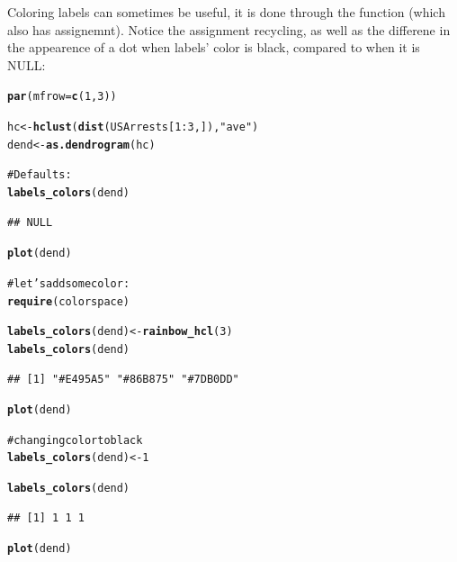 \documentclass[shortnames,nojss,article]{jss}\usepackage{graphicx, color}
\makeatletter
\newcommand{\hlfunctioncall}[1]{\textcolor[rgb]{0.501960784313725,0,0.329411764705882}{\textbf{#1}}}%
\newcommand{\hlstring}[1]{\textcolor[rgb]{0.6,0.6,1}{#1}}%
\newcommand{\hlcomment}[1]{\textcolor[rgb]{0.180392156862745,0.6,0.341176470588235}{#1}}%
\newenvironment{kframe}{%
 \def\at@end@of@kframe{}%
 \ifinner\ifhmode%
  \def\at@end@of@kframe{\end{minipage}}%
  \begin{minipage}{\columnwidth}%
 \fi\fi%
 \def\FrameCommand##1{\hskip\@totalleftmargin \hskip-\fboxsep
 \colorbox{shadecolor}{##1}\hskip-\fboxsep
     \hskip-\linewidth \hskip-\@totalleftmargin \hskip\columnwidth}%
 \MakeFramed {\advance\hsize-\width
   \@totalleftmargin\z@ \linewidth\hsize
   \@setminipage}}%
 {\par\unskip\endMakeFramed%
 \at@end@of@kframe}
\newenvironment{knitrout}{}{} %
\makeatother
\begin{document}
Coloring labels can sometimes be useful, it is done through the  function (which also has assignemnt). Notice the assignment recycling, as well as the differene in the appearence of a dot when labels' color is black, compared to when it is NULL:

\begin{knitrout}
\color{fgcolor}\begin{kframe}
\begin{alltt}

\hlfunctioncall{par}(mfrow = \hlfunctioncall{c}(1, 3))

hc <- \hlfunctioncall{hclust}(\hlfunctioncall{dist}(USArrests[1:3, ]), \hlstring{"ave"})
dend <- \hlfunctioncall{as.dendrogram}(hc)

\hlcomment{# Defaults:}
\hlfunctioncall{labels_colors}(dend)
\end{alltt}
\begin{verbatim}
## NULL
\end{verbatim}
\begin{alltt}
\hlfunctioncall{plot}(dend)

\hlcomment{# let's add some color:}
\hlfunctioncall{require}(colorspace)
\end{alltt}


{\ttfamily\noindent\itshape\color{messagecolor}{\#\# Loading required package: colorspace}}\begin{alltt}
\hlfunctioncall{labels_colors}(dend) <- \hlfunctioncall{rainbow_hcl}(3)
\hlfunctioncall{labels_colors}(dend)
\end{alltt}
\begin{verbatim}
## [1] "#E495A5" "#86B875" "#7DB0DD"
\end{verbatim}
\begin{alltt}
\hlfunctioncall{plot}(dend)

\hlcomment{# changing color to black}
\hlfunctioncall{labels_colors}(dend) <- 1
\end{alltt}


{\ttfamily\noindent\color{warningcolor}{\#\# Warning: Length of color vector was shorter then the number of leaves - vector color recycled}}\begin{alltt}
\hlfunctioncall{labels_colors}(dend)
\end{alltt}
\begin{verbatim}
## [1] 1 1 1
\end{verbatim}
\begin{alltt}
\hlfunctioncall{plot}(dend)
\end{alltt}
\end{kframe}


\end{knitrout}
\end{document}
